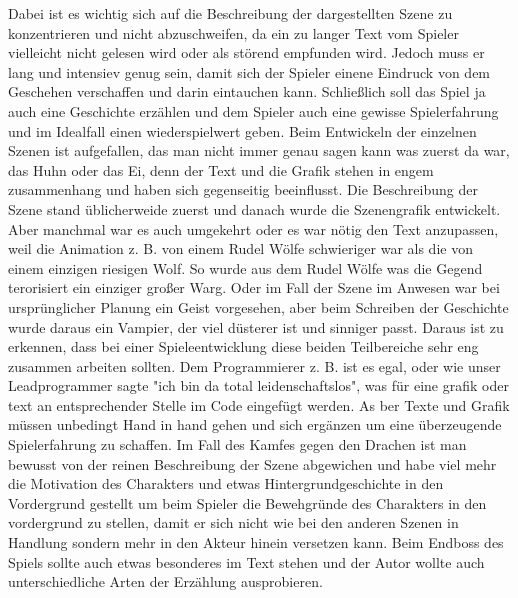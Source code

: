 Dabei ist es wichtig sich auf die Beschreibung der dargestellten Szene zu konzentrieren und nicht abzuschweifen, da ein zu langer Text vom Spieler vielleicht nicht gelesen wird oder als störend empfunden wird. Jedoch muss er lang und intensiev genug sein, damit sich der Spieler einene Eindruck von dem Geschehen verschaffen und darin eintauchen kann. Schließlich soll das Spiel ja auch eine Geschichte erzählen und dem Spieler auch eine gewisse Spielerfahrung und im Idealfall einen wiederspielwert geben. Beim Entwickeln der einzelnen Szenen ist aufgefallen, das man nicht immer genau sagen kann was zuerst da war, das Huhn oder das Ei, denn der Text und die Grafik stehen in engem zusammenhang und haben sich gegenseitig beeinflusst. Die Beschreibung der Szene stand üblicherweide zuerst und danach wurde die Szenengrafik entwickelt. Aber manchmal war es auch umgekehrt oder es war nötig den Text anzupassen, weil die Animation z. B. von einem Rudel Wölfe schwieriger war als die von einem einzigen riesigen Wolf. So wurde aus dem Rudel Wölfe was die Gegend terorisiert ein einziger großer Warg. Oder im Fall der Szene im Anwesen war bei ursprünglicher Planung ein Geist vorgesehen, aber beim Schreiben der Geschichte wurde daraus ein Vampier, der viel düsterer ist und sinniger passt. Daraus ist zu erkennen, dass bei einer Spieleentwicklung diese beiden Teilbereiche sehr eng zusammen arbeiten sollten. Dem Programmierer z. B. ist es egal, oder wie unser Leadprogrammer sagte "ich bin da total leidenschaftslos", was für eine grafik oder text an entsprechender Stelle im Code eingefügt werden. As ber Texte und Grafik müssen unbedingt Hand in hand gehen und sich ergänzen um eine überzeugende Spielerfahrung zu schaffen. Im Fall des Kamfes gegen den Drachen ist man bewusst von der reinen Beschreibung der Szene abgewichen und habe viel mehr die Motivation des Charakters und etwas Hintergrundgeschichte in den Vordergrund gestellt um beim Spieler die Bewehgründe des Charakters in den vordergrund zu stellen, damit er sich nicht wie bei den anderen Szenen in Handlung sondern mehr in den Akteur hinein versetzen kann. Beim Endboss des Spiels sollte auch etwas besonderes im Text stehen und der Autor wollte auch unterschiedliche Arten der Erzählung ausprobieren.